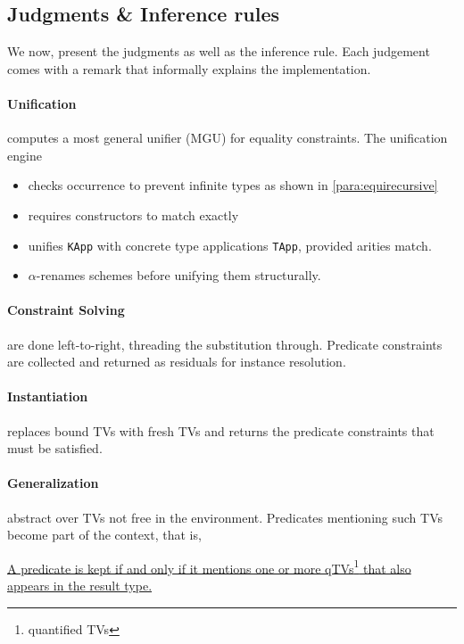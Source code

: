 \documentclass[a4paper, 11pt]{article}
\theoremstyle{remark}\newtheorem*{remark}{Remark}
\theoremstyle{definition}\newtheorem*{definition}{Definition}
\begin{document}
\subsection{Judgments \& Inference rules}

We now, present the judgments as well as the inference rule. Each judgement comes with
a remark that informally explains the implementation.

\paragraph{Unification} computes a most general unifier (MGU) for equality constraints. The unification engine
\begin{itemize}
\item checks occurrence to prevent infinite types as shown in \autoref{para:equirecursive}
\item requires constructors to match exactly
\item unifies \texttt{KApp} with concrete type applications \texttt{TApp}, provided arities match.
\item \(\alpha\)-renames schemes before unifying them structurally.
\end{itemize}
\paragraph{Constraint Solving} are done left-to-right, threading the substitution through.
Predicate constraints are collected and returned as residuals for instance resolution.
\paragraph{Instantiation} replaces bound TVs with fresh TVs and returns the predicate constraints that
must be satisfied.
\paragraph{Generalization} abstract over TVs not free in the environment. Predicates mentioning
such TVs become part of the context, that is,

\underline{A predicate is kept if and only if it mentions
one or more qTVs\footnote{quantified TVs} that also appears in the result type.}
\end{document}
